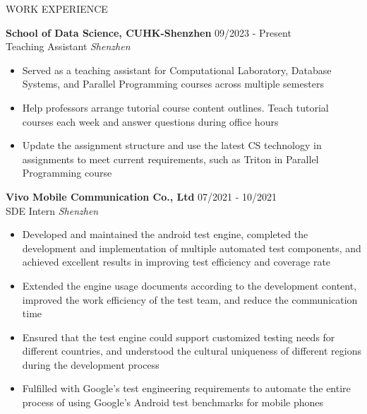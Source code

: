 \documentclass{resume} %
\begin{document}
\begin{rSection}{WORK EXPERIENCE}

\setlength{\parskip}{1.5pt}

\textbf{School of Data Science, CUHK-Shenzhen} \hfill 09/2023 - Present\\
Teaching Assistant \hfill \textit{Shenzhen}
\begin{itemize}
    \setlength{\itemsep}{0pt}
    \setlength{\parsep}{0pt}
    \setlength{\parskip}{0pt}
    \item Served as a teaching assistant for Computational Laboratory, Database Systems, and Parallel Programming courses across multiple semesters
    \item Help professors arrange tutorial course content outlines. Teach tutorial courses each week and answer questions during office hours
    \item Update the assignment structure and use the latest CS technology in assignments to meet current requirements, such as Triton in Parallel Programming course
\end{itemize}

\textbf{Vivo Mobile Communication Co., Ltd} \hfill 07/2021 - 10/2021\\
SDE Intern \hfill \textit{Shenzhen}
\begin{itemize}
    \setlength{\itemsep}{0pt}
    \setlength{\parsep}{0pt}
    \setlength{\parskip}{0pt}
    \item Developed and maintained the android test engine, completed the development and implementation of multiple automated test components, and achieved excellent results in improving test efficiency and coverage rate
    \item Extended the engine usage documents according to the development content, improved the work efficiency of the test team, and reduce the communication time
    \item Ensured that the test engine could support customized testing needs for different countries, and understood the cultural uniqueness of different regions during the development process
    \item Fulfilled with Google's test engineering requirements to automate the entire process of using Google's Android test benchmarks for mobile phones
\end{itemize}

\end{rSection} 

\end{document}
